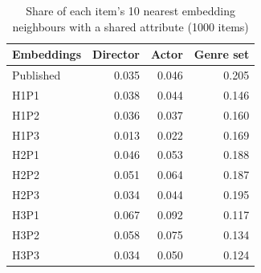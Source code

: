 \begin{table}[H]
\centering
\small
\begin{tabular}{lrrr}
\toprule
Embeddings & Director & Actor & Genre set \\
\midrule
Published & 0.035 & 0.046 & 0.205 \\
H1P1 & 0.038 & 0.044 & 0.146 \\
H1P2 & 0.036 & 0.037 & 0.160 \\
H1P3 & 0.013 & 0.022 & 0.169 \\
H2P1 & 0.046 & 0.053 & 0.188 \\
H2P2 & 0.051 & 0.064 & 0.187 \\
H2P3 & 0.034 & 0.044 & 0.195 \\
H3P1 & 0.067 & 0.092 & 0.117 \\
H3P2 & 0.058 & 0.075 & 0.134 \\
H3P3 & 0.034 & 0.050 & 0.124 \\
\bottomrule
\end{tabular}
\caption{Share of each item's 10 nearest embedding neighbours with a shared attribute (1000 items)\RunTag}
\label{tab:embedding_neighbours}
\end{table}
